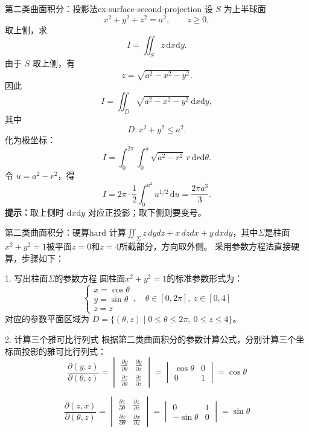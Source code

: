 \documentclass[UTF8,zihao=-4,openany]{ctexbook}
\begin{document}
\begin{example}{第二类曲面积分：投影法}{ex-surface-second-projection}
设 $S$ 为上半球面
\[
  x^2+y^2+z^2=a^2,\qquad z\geq0,
\]
取上侧，求
\[
  I=\iint_S z\,\mathrm{d}x\mathrm{d}y.
\]
\tcblower
由于 $S$ 取上侧，有
\[
  z=\sqrt{a^2-x^2-y^2}.
\]
因此
\[
  I=\iint_D\sqrt{a^2-x^2-y^2}\,\mathrm{d}x\mathrm{d}y,
\]
其中
\[
  D:x^2+y^2\leq a^2.
\]
化为极坐标：
\[
  I=\int_0^{2\pi}\int_0^a \sqrt{a^2-r^2}\,r\,\mathrm{d}r\mathrm{d}\theta.
\]
令 $u=a^2-r^2$，得
\[
  I=2\pi\cdot\frac12\int_0^{a^2}u^{1/2}\,\mathrm{d}u
  =\frac{2\pi a^3}{3}.
\]
\textbf{提示：}取上侧时 $\mathrm{d}x\mathrm{d}y$ 对应正投影；取下侧则要变号。
\end{example}

\begin{example}{第二类曲面积分：硬算}{hard}
计算$\displaystyle\iint_\Sigma z \, dydz + x \, dzdx + y \, dxdy$，其中$\Sigma$是柱面$x^2 + y^2 = 1$被平面$z = 0$和$z = 4$所截部分，方向取外侧。
\tcblower
采用参数方程法直接硬算，步骤如下：

1. 写出柱面$\Sigma$的参数方程
圆柱面$x^2 + y^2 = 1$的标准参数形式为：
$$
\begin{cases}
x = \cos\theta \\
y = \sin\theta \\
z = z
\end{cases}, \quad \theta \in [0, 2\pi],\ z \in [0, 4]
$$
对应的参数平面区域为 $D = \{ (\theta, z) \mid 0 \le \theta \le 2\pi,\ 0 \le z \le 4 \}$。

2. 计算三个雅可比行列式
根据第二类曲面积分的参数计算公式，分别计算三个坐标面投影的雅可比行列式：
$$
\frac{\partial(y,z)}{\partial(\theta,z)} = \begin{vmatrix}
\frac{\partial y}{\partial \theta} & \frac{\partial y}{\partial z} \\
\frac{\partial z}{\partial \theta} & \frac{\partial z}{\partial z}
\end{vmatrix} = \begin{vmatrix}
\cos\theta & 0 \\
0 & 1
\end{vmatrix} = \cos\theta
$$

$$
\frac{\partial(z,x)}{\partial(\theta,z)} = \begin{vmatrix}
\frac{\partial z}{\partial \theta} & \frac{\partial z}{\partial z} \\
\frac{\partial x}{\partial \theta} & \frac{\partial x}{\partial z}
\end{vmatrix} = \begin{vmatrix}
0 & 1 \\
-\sin\theta & 0
\end{vmatrix} = \sin\theta
$$


\end{example}
\end{document}
